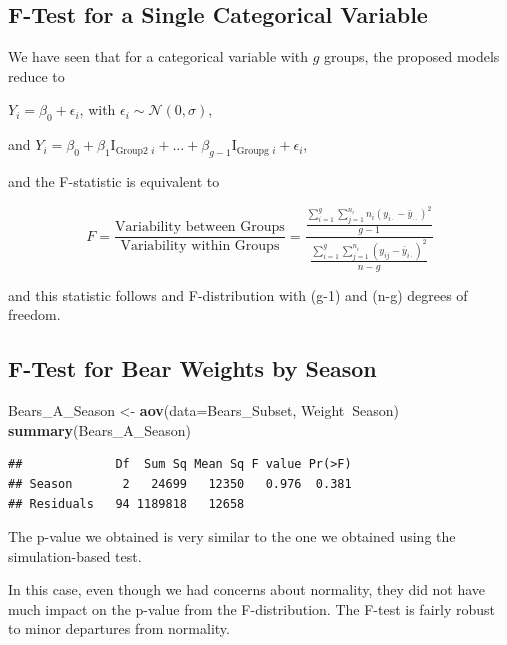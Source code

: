 \documentclass[]{book}
\newenvironment{Shaded}{\begin{snugshade}}{\end{snugshade}}
\newcommand{\KeywordTok}[1]{\textcolor[rgb]{0.13,0.29,0.53}{\textbf{#1}}}
\newcommand{\DataTypeTok}[1]{\textcolor[rgb]{0.13,0.29,0.53}{#1}}
\newcommand{\StringTok}[1]{\textcolor[rgb]{0.31,0.60,0.02}{#1}}
\newcommand{\OperatorTok}[1]{\textcolor[rgb]{0.81,0.36,0.00}{\textbf{#1}}}
\newcommand{\NormalTok}[1]{#1}
\begin{document}
\subsection{F-Test for a Single Categorical
Variable}\label{f-test-for-a-single-categorical-variable}

We have seen that for a categorical variable with \(g\) groups, the
proposed models reduce to

\(Y_i = \beta_0 + \epsilon_i\), with
\(\epsilon_i\sim\mathcal{N}(0,\sigma)\),

and
\(Y_i = \beta_0 + \beta_1\text{I}_{\text{Group2 }{i}} + \ldots + \beta_{g-1}\text{I}_{\text{Groupg }{i}}+ \epsilon_i\),

and the F-statistic is equivalent to

\[
F= \frac{\text{Variability between Groups}}{\text{Variability within Groups}}= \frac{\frac{\displaystyle\sum_{i=1}^g\sum_{j=1}^{n_i}n_i(y_{i\cdot}-\bar{y}_{\cdot\cdot})^2}{g-1}}{\frac{\displaystyle\sum_{i=1}^g\sum_{j=1}^{n_i}(y_{ij}-\bar{y}_{i\cdot})^2}{n-g}}
\]

and this statistic follows and F-distribution with (g-1) and (n-g)
degrees of freedom.

\subsection{F-Test for Bear Weights by
Season}\label{f-test-for-bear-weights-by-season}

\begin{Shaded}
\begin{Highlighting}[]
\NormalTok{Bears_A_Season <-}\StringTok{ }\KeywordTok{aov}\NormalTok{(}\DataTypeTok{data=}\NormalTok{Bears_Subset, Weight}\OperatorTok{~}\NormalTok{Season)}
\KeywordTok{summary}\NormalTok{(Bears_A_Season)}
\end{Highlighting}
\end{Shaded}

\begin{verbatim}
##             Df  Sum Sq Mean Sq F value Pr(>F)
## Season       2   24699   12350   0.976  0.381
## Residuals   94 1189818   12658
\end{verbatim}

The p-value we obtained is very similar to the one we obtained using the
simulation-based test.

In this case, even though we had concerns about normality, they did not
have much impact on the p-value from the F-distribution. The F-test is
fairly robust to minor departures from normality.
\end{document}
